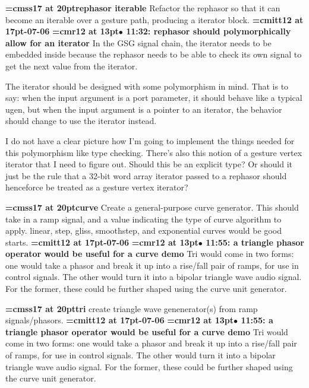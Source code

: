 {\medskip\noindent\bf\font\titlefont=cmss17 at 20pt\titlefont rephasor iterable}\medskip
Refactor the rephasor so that it can become an iterable
over a gesture path, producing a iterator block.
{\medskip\noindent\bf\font\titlefont=cmitt12 at 17pt-07-06}\medskip
{\smallskip\noindent\bf\font\titlefont=cmr12 at 13pt\titlefont $\bullet$ 11:32: rephasor should polymorphically allow for an iterator}\smallskip
In the GSG signal chain, the iterator needs to be embedded inside because the rephasor needs to be able to check its own signal to get the next value from the iterator.
\par

The iterator should be designed with some polymorphism in mind. That is to say: when the input argument is a port parameter, it should behave like a typical ugen, but when the input argument is a pointer to an iterator, the behavior should change to use the iterator instead.
\par

I do not have a clear picture how I'm going to implement the things needed for this polymorphism like type checking. There's also this notion of a gesture vertex iterator that I need to figure out. Should this be an explicit type? Or should it just be the rule that a 32-bit word array iterator passed to a rephasor should henceforce be treated as a gesture vertex iterator?
\par

{\medskip\noindent\bf\font\titlefont=cmss17 at 20pt\titlefont curve}\medskip
Create a general-purpose curve generator. This should
take in a ramp signal, and a value indicating the type
of curve algorithm to apply. linear, step, gliss, smoothstep,
and exponential curves would be good starts.
{\medskip\noindent\bf\font\titlefont=cmitt12 at 17pt-07-06}\medskip
{\smallskip\noindent\bf\font\titlefont=cmr12 at 13pt\titlefont $\bullet$ 11:55: a triangle phasor operator would be useful for a curve demo}\smallskip
Tri would come in two forms: one would take a phasor and break it up into a rise/fall pair of ramps, for use in control signals. The other would turn it into a bipolar triangle wave audio signal. For the former, these could be further shaped using the curve unit generator.
\par

{\medskip\noindent\bf\font\titlefont=cmss17 at 20pt\titlefont tri}\medskip
create triangle wave genenerator(s) from ramp signals/phasors.
{\medskip\noindent\bf\font\titlefont=cmitt12 at 17pt-07-06}\medskip
{\smallskip\noindent\bf\font\titlefont=cmr12 at 13pt\titlefont $\bullet$ 11:55: a triangle phasor operator would be useful for a curve demo}\smallskip
Tri would come in two forms: one would take a phasor and break it up into a rise/fall pair of ramps, for use in control signals. The other would turn it into a bipolar triangle wave audio signal. For the former, these could be further shaped using the curve unit generator.
\par

